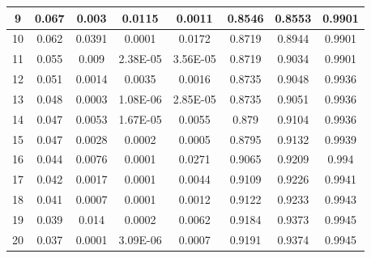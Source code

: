 \documentclass[12pt]{article}
\begin{document}
\begin{table}[h!]
{\begin{tabular}{|c|c|c|c|c|c|c|c|}
    \hline
    9     & 0.067 & 0.003 & 0.0115 & 0.0011 & 0.8546 & 0.8553 & 0.9901 \\
    \hline
    10    & 0.062 & 0.0391 & 0.0001 & 0.0172 & 0.8719 & 0.8944 & 0.9901 \\
    \hline
    11    & 0.055 & 0.009 & 2.38E-05 & 3.56E-05 & 0.8719 & 0.9034 & 0.9901 \\
    \hline
    12    & 0.051 & 0.0014 & 0.0035 & 0.0016 & 0.8735 & 0.9048 & 0.9936 \\
    \hline
    13    & 0.048 & 0.0003 & 1.08E-06 & 2.85E-05 & 0.8735 & 0.9051 & 0.9936 \\
    \hline
    14    & 0.047 & 0.0053 & 1.67E-05 & 0.0055 & 0.879 & 0.9104 & 0.9936 \\
    \hline
    15    & 0.047 & 0.0028 & 0.0002 & 0.0005 & 0.8795 & 0.9132 & 0.9939 \\
    \hline
    16    & 0.044 & 0.0076 & 0.0001 & 0.0271 & 0.9065 & 0.9209 & 0.994 \\
    \hline
    17    & 0.042 & 0.0017 & 0.0001 & 0.0044 & 0.9109 & 0.9226 & 0.9941 \\
    \hline
    18    & 0.041 & 0.0007 & 0.0001 & 0.0012 & 0.9122 & 0.9233 & 0.9943 \\
    \hline
    19    & 0.039 & 0.014 & 0.0002 & 0.0062 & 0.9184 & 0.9373 & 0.9945 \\
    \hline
    20    & 0.037 & 0.0001 & 3.09E-06 & 0.0007 & 0.9191 & 0.9374 & 0.9945 \\
    \hline
    \end{tabular}%
    }
  \label{tab:addlabel}%
\end{table}%
\end{document}
